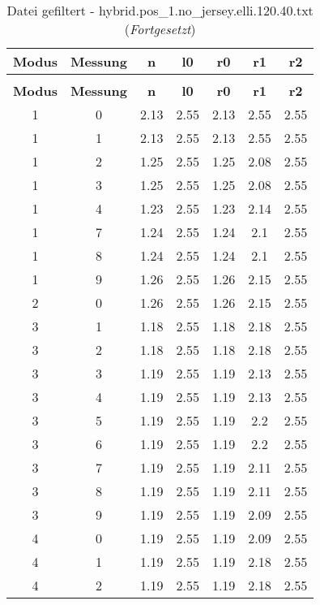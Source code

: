 \begin{longtable}{|c|c||c||c||c|c|c|}
	\caption{Datei gefiltert - hybrid.pos\_1.no\_jersey.elli.120.40.txt} \label{tab:hybrid.pos-1.no-jersey.elli.120.40.txt} \\ \hline
	\textbf{Modus} & \textbf{Messung} & \textbf{n} & \textbf{l0} & \textbf{r0} & \textbf{r1} & \textbf{r2}\\ \hline
	\endfirsthead
	\caption[]{Datei gefiltert - hybrid.pos\_1.no\_jersey.elli.120.40.txt (\emph{Fortgesetzt})} \\ \hline
	\textbf{Modus} & \textbf{Messung} & \textbf{n} & \textbf{l0} & \textbf{r0} & \textbf{r1} & \textbf{r2}\\ \hline
	\endhead
	1 & 0 & 2.13 & 2.55 & 2.13 & 2.55 & 2.55 \\ \hline
	1 & 1 & 2.13 & 2.55 & 2.13 & 2.55 & 2.55 \\ \hline
	1 & 2 & 1.25 & 2.55 & 1.25 & 2.08 & 2.55 \\ \hline
	1 & 3 & 1.25 & 2.55 & 1.25 & 2.08 & 2.55 \\ \hline
	1 & 4 & 1.23 & 2.55 & 1.23 & 2.14 & 2.55 \\ \hline
	1 & 7 & 1.24 & 2.55 & 1.24 & 2.1 & 2.55 \\ \hline
	1 & 8 & 1.24 & 2.55 & 1.24 & 2.1 & 2.55 \\ \hline
	1 & 9 & 1.26 & 2.55 & 1.26 & 2.15 & 2.55 \\ \hline
	2 & 0 & 1.26 & 2.55 & 1.26 & 2.15 & 2.55 \\ \hline
	3 & 1 & 1.18 & 2.55 & 1.18 & 2.18 & 2.55 \\ \hline
	3 & 2 & 1.18 & 2.55 & 1.18 & 2.18 & 2.55 \\ \hline
	3 & 3 & 1.19 & 2.55 & 1.19 & 2.13 & 2.55 \\ \hline
	3 & 4 & 1.19 & 2.55 & 1.19 & 2.13 & 2.55 \\ \hline
	3 & 5 & 1.19 & 2.55 & 1.19 & 2.2 & 2.55 \\ \hline
	3 & 6 & 1.19 & 2.55 & 1.19 & 2.2 & 2.55 \\ \hline
	3 & 7 & 1.19 & 2.55 & 1.19 & 2.11 & 2.55 \\ \hline
	3 & 8 & 1.19 & 2.55 & 1.19 & 2.11 & 2.55 \\ \hline
	3 & 9 & 1.19 & 2.55 & 1.19 & 2.09 & 2.55 \\ \hline
	4 & 0 & 1.19 & 2.55 & 1.19 & 2.09 & 2.55 \\ \hline
	4 & 1 & 1.19 & 2.55 & 1.19 & 2.18 & 2.55 \\ \hline
	4 & 2 & 1.19 & 2.55 & 1.19 & 2.18 & 2.55 \\ \hline

\end{longtable}
